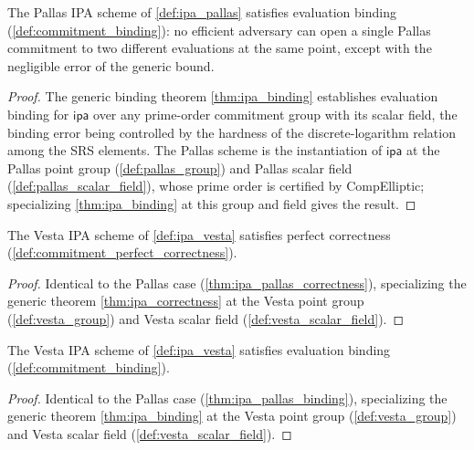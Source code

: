 \begin{theorem}
  \label{thm:ipa_pallas_binding}
  The Pallas IPA scheme of \cref{def:ipa_pallas} satisfies evaluation binding
  (\cref{def:commitment_binding}): no efficient adversary can open a single Pallas
  commitment to two different evaluations at the same point, except with the
  negligible error of the generic bound.
  \begin{proof}
    The generic binding theorem \cref{thm:ipa_binding} establishes evaluation
    binding for \(\textsf{ipa}\) over any prime-order commitment group with its
    scalar field, the binding error being controlled by the hardness of the
    discrete-logarithm relation among the SRS elements. The Pallas scheme is the
    instantiation of \(\textsf{ipa}\) at the Pallas point group
    (\cref{def:pallas_group}) and Pallas scalar field
    (\cref{def:pallas_scalar_field}), whose prime order is certified by
    CompElliptic; specializing \cref{thm:ipa_binding} at this group and field
    gives the result.
  \end{proof}
\end{theorem}

\begin{theorem}
  \label{thm:ipa_vesta_correctness}
  The Vesta IPA scheme of \cref{def:ipa_vesta} satisfies perfect correctness
  (\cref{def:commitment_perfect_correctness}).
  \begin{proof}
    Identical to the Pallas case (\cref{thm:ipa_pallas_correctness}), specializing
    the generic theorem \cref{thm:ipa_correctness} at the Vesta point group
    (\cref{def:vesta_group}) and Vesta scalar field
    (\cref{def:vesta_scalar_field}).
  \end{proof}
\end{theorem}

\begin{theorem}
  \label{thm:ipa_vesta_binding}
  The Vesta IPA scheme of \cref{def:ipa_vesta} satisfies evaluation binding
  (\cref{def:commitment_binding}).
  \begin{proof}
    Identical to the Pallas case (\cref{thm:ipa_pallas_binding}), specializing the
    generic theorem \cref{thm:ipa_binding} at the Vesta point group
    (\cref{def:vesta_group}) and Vesta scalar field
    (\cref{def:vesta_scalar_field}).
  \end{proof}
\end{theorem}
